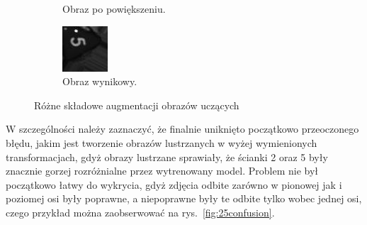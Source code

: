 \begin{figure}[h]
\begin{subfigure}[t]{0.32\linewidth}
        \caption{Obraz po powiększeniu.}
        \label{fig:5zoom}
    \end{subfigure}
    \hfill
    \begin{subfigure}[t]{0.32\linewidth}
        \centering
        \includegraphics[width=\linewidth]{chapters/04-czytanie/figures/combined_1}
        \caption{Obraz wynikowy.}
        \label{fig:5combined}
    \end{subfigure}

    \caption{Różne składowe augmentacji obrazów uczących}
    \label{fig:5augment}
\end{figure}


W szczególności należy zaznaczyć, że finalnie uniknięto początkowo przeoczonego błędu,
jakim jest tworzenie obrazów lustrzanych w wyżej wymienionych transformacjach, gdyż obrazy lustrzane
sprawiały, że ścianki 2 oraz 5 były znacznie gorzej rozróżnialne przez wytrenowany model.
Problem nie był początkowo łatwy do wykrycia, gdyż zdjęcia odbite zarówno w pionowej jak i poziomej osi były poprawne,
a niepoprawne były te odbite tylko wobec jednej osi, czego przykład można zaobserwować na rys.~\ref{fig:25confusion}.


